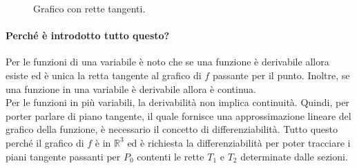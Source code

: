 \begin{figure}[ht]
    \caption{Grafico con rette tangenti.}\label{fig:grafico_f_R3_osservazione}
\end{figure}

\paragraph{Perché è introdotto tutto questo?} Per le funzioni di una variabile è noto che se una funzione è derivabile allora esiste ed è unica la retta tangente al grafico di $f$ passante per il punto. Inoltre, se una funzione in una variabile è derivabile allora è continua.\\
Per le funzioni in più variabili, la derivabilità non implica continuità. Quindi, per porter parlare di piano tangente, il quale fornisce una approssimazione lineare del grafico della funzione, è necessario il concetto di differenziabilità. Tutto questo perché il grafico di $f$ è in $\mathbb{R}^3$ ed è richiesta la differenziabilità per poter tracciare i piani tangente passanti per $P_0$ contenti le rette $T_1$ e $T_2$ determinate dalle sezioni.

